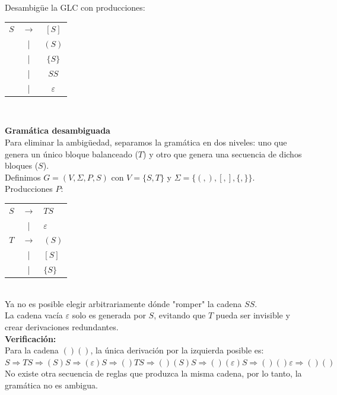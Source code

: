 \documentclass[12pt]{article}
\newcommand{\Aspace}{0.2cm}
\begin{document}
 Desambigüe la GLC con producciones: \par
\begin{tabular}{ccc}
    $S$ & $\rightarrow$ & $[S]$ \\
    & | & $(S)$ \\
    & | & $\{S\}$ \\
    & | & $SS$ \\
    & | & $\varepsilon$
\end{tabular} \\
    \vspace{\Aspace} \par
    { \color{azul}
    \raggedright
        \textbf{Gramática desambiguada} \\
        Para eliminar la ambigüedad, separamos la gramática en dos niveles: uno que genera un único bloque balanceado ($T$) y otro que genera una secuencia de dichos bloques ($S$). \\

        \vspace{0.5cm}
        Definimos $G = (V, \Sigma, P, S)$ con $V = \{ S, T \}$ y $\Sigma = \{ (, ), [, ], \{, \} \}$. \\
        Producciones $P$: \\
        \begin{tabular}{ccl}
            $S$ & $\rightarrow$ & $T S$ \\
            & | & $\varepsilon$ \\
            $T$ & $\rightarrow$ & $(S)$ \\
            & | & $[S]$ \\
            & | & $\{S\}$ \\
        \end{tabular} \\
        
        \vspace{0.5cm}
        Ya no es posible elegir arbitrariamente dónde "romper" la cadena $SS$. \\
        La cadena vacía $\varepsilon$ solo es generada por $S$, evitando que $T$ pueda ser invisible y crear derivaciones redundantes. \\ 

        \vspace{0.5cm}
        \textbf{Verificación:} \\
        Para la cadena $()()$, la única derivación por la izquierda posible es: \\
        $S \Rightarrow TS \Rightarrow (S)S \Rightarrow (\varepsilon)S \Rightarrow ()TS \Rightarrow ()(S)S \Rightarrow ()(\varepsilon)S \Rightarrow ()()\varepsilon \Rightarrow ()()$ \\
        No existe otra secuencia de reglas que produzca la misma cadena, por lo tanto, la gramática no es ambigua.
    }
\end{document}
